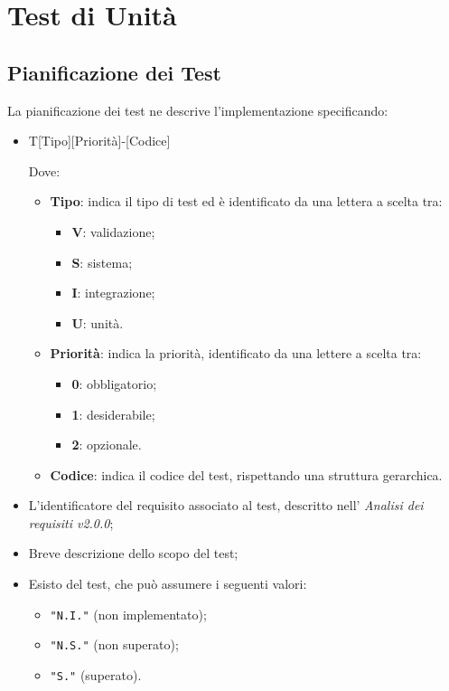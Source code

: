 \section{Test di Unità}
\label{test_u}
\subsection{Pianificazione dei Test}

La pianificazione dei test ne descrive l'implementazione specificando: 
\begin{itemize}
	\item \begin{center}
	T[Tipo][Priorità]-[Codice]

	\end{center}
	Dove: 
	
	\begin{itemize}
		\item \textbf{Tipo}: indica il tipo di test ed è identificato da una lettera a scelta tra: 

		\begin{itemize}
			\item \textbf{V}: validazione; 
			\item \textbf{S}: sistema; 
			\item \textbf{I}: integrazione; 
			\item \textbf{U}: unità.
		\end{itemize}
		
		\item \textbf{Priorità}: indica la priorità, identificato da una lettere a scelta tra: 
		\begin{itemize}
			\item \textbf{0}: obbligatorio; 
			\item \textbf{1}: desiderabile; 
			\item \textbf{2}: opzionale.
		\end{itemize}				
		\item \textbf{Codice}: indica il codice del test, rispettando una struttura gerarchica. 
	\end{itemize}
	
	\item L'identificatore del requisito associato al test, descritto nell' \textit{Analisi dei requisiti v2.0.0}; 
	\item Breve descrizione dello scopo del test; 
	\item Esisto del test, che può assumere i seguenti valori: 
	\begin{itemize}
		\item \texttt{"N.I."} (non implementato);
		\item \texttt{"N.S."} (non superato); 
		\item \texttt{"S."} (superato). 
	\end{itemize}
\end{itemize}

